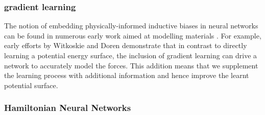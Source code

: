 \documentclass{article}
\begin{document}
\subsubsection{gradient learning}


The notion of embedding physically-informed inductive biases in neural networks can be found in numerous early work aimed at modelling materials \cite{witkoskie_neural_2005, pukrittayakamee_simultaneous_2009, smith_ani-1_2017, rupp_fast_2012, yao_tensormol-01_2018}. For example, early efforts by Witkoskie and Doren \cite{witkoskie_neural_2005} demonstrate that in contrast to directly learning a potential energy surface, the inclusion of gradient learning can drive a network to accurately model the forces. This addition means that we supplement the learning process with additional information and hence improve the learnt potential surface. 




\subsubsection{Hamiltonian Neural Networks}
\end{document}
